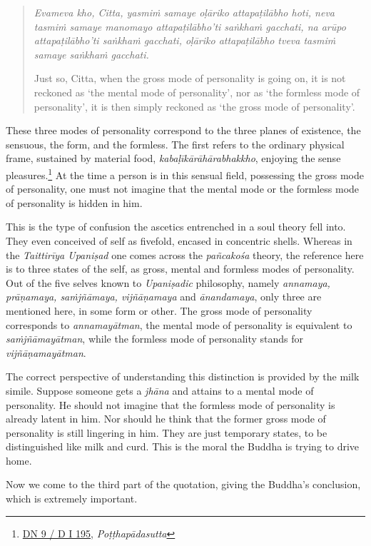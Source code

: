 \begin{quote}
\emph{Evameva kho, Citta, yasmiṁ samaye oḷāriko attapaṭilābho hoti, neva tasmiṁ samaye manomayo attapaṭilābho'ti saṅkhaṁ gacchati, na arūpo attapaṭilābho'ti saṅkhaṁ gacchati, oḷāriko attapaṭilābho tveva tasmiṁ samaye saṅkhaṁ gacchati.}

Just so, Citta, when the gross mode of personality is going on, it is not reckoned as `the mental mode of personality', nor as `the formless mode of personality', it is then simply reckoned as `the gross mode of personality'.
\end{quote}

These three modes of personality correspond to the three planes of existence, the sensuous, the form, and the formless. The first refers to the ordinary physical frame, sustained by material food, \emph{kabaḷīkārāhārabhakkho}, enjoying the sense pleasures.\footnote{\href{https://suttacentral.net/dn9/pli/ms}{DN 9 / D I 195}, \emph{Poṭṭhapādasutta}} At the time a person is in this sensual field, possessing the gross mode of personality, one must not imagine that the mental mode or the formless mode of personality is hidden in him.

This is the type of confusion the ascetics entrenched in a soul theory fell into. They even conceived of self as fivefold, encased in concentric shells. Whereas in the \emph{Taittirīya Upaniṣad} one comes across the \emph{pañcakośa} theory, the reference here is to three states of the self, as gross, mental and formless modes of personality. Out of the five selves known to \emph{Upaniṣadic} philosophy, namely \emph{annamaya, prāṇamaya, saṁjñāmaya, vijñāṇamaya} and \emph{ānandamaya}, only three are mentioned here, in some form or other. The gross mode of personality corresponds to \emph{annamayātman}, the mental mode of personality is equivalent to \emph{saṁjñāmayātman}, while the formless mode of personality stands for \emph{vijñāṇamayātman}.

The correct perspective of understanding this distinction is provided by the milk simile. Suppose someone gets a \emph{jhāna} and attains to a mental mode of personality. He should not imagine that the formless mode of personality is already latent in him. Nor should he think that the former gross mode of personality is still lingering in him. They are just temporary states, to be distinguished like milk and curd. This is the moral the Buddha is trying to drive home.

Now we come to the third part of the quotation, giving the Buddha's conclusion, which is extremely important.

